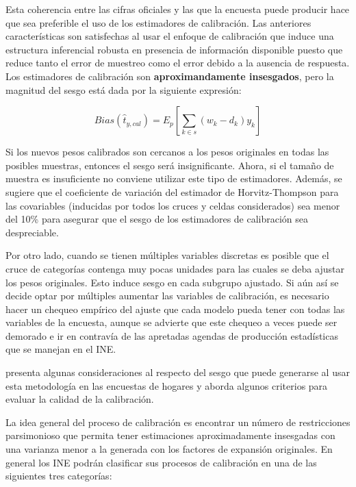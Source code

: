 Esta coherencia entre las cifras oficiales y las que la encuesta puede producir hace que sea preferible el uso de los estimadores de calibración. Las anteriores características son satisfechas al usar el enfoque de calibración que induce una estructura inferencial robusta en presencia de información disponible puesto que reduce tanto el error de muestreo como el error debido a la ausencia de respuesta. Los estimadores de calibración son \textbf{aproximandamente insesgados}, pero la magnitud del sesgo está dada por la siguiente expresión:

\[
Bias(\hat{t}_{y, cal}) = E_p \left[ \sum_{k \in s} (w_k - d_k) y_k \right]
\]

Si los nuevos pesos calibrados son cercanos a los pesos originales en todas las posibles muestras, entonces el sesgo será insignificante. Ahora, si el tamaño de muestra es insuficiente no conviene utilizar este tipo de estimadores. Además, se sugiere que el coeficiente de variación del estimador de Horvitz-Thompson para las covariables (inducidas por todos los cruces y celdas considerados) sea menor del 10\% para asegurar que el sesgo de los estimadores de calibración sea despreciable.

Por otro lado, cuando se tienen múltiples variables discretas es posible que el cruce de categorías contenga muy pocas unidades para las cuales se deba ajustar los pesos originales. Esto induce sesgo en cada subgrupo ajustado. Si aún así se decide optar por múltiples aumentar las variables de calibración, es necesario hacer un chequeo empírico del ajuste que cada modelo pueda tener con todas las variables de la encuesta, aunque se advierte que este chequeo a veces puede ser demorado e ir en contravía de las apretadas agendas de producción estadísticas que se manejan en el INE.

\citet{Silva_2004} presenta algunas consideraciones al respecto del sesgo que puede generarse al usar esta metodología en las encuestas de hogares y aborda algunos criterios para evaluar la calidad de la calibración.

La idea general del proceso de calibración es encontrar un número de restricciones parsimonioso que permita tener estimaciones aproximadamente insesgadas con una varianza menor a la generada con los factores de expansión originales. En general los INE podrán clasificar sus procesos de calibración en una de las siguientes tres categorías:

